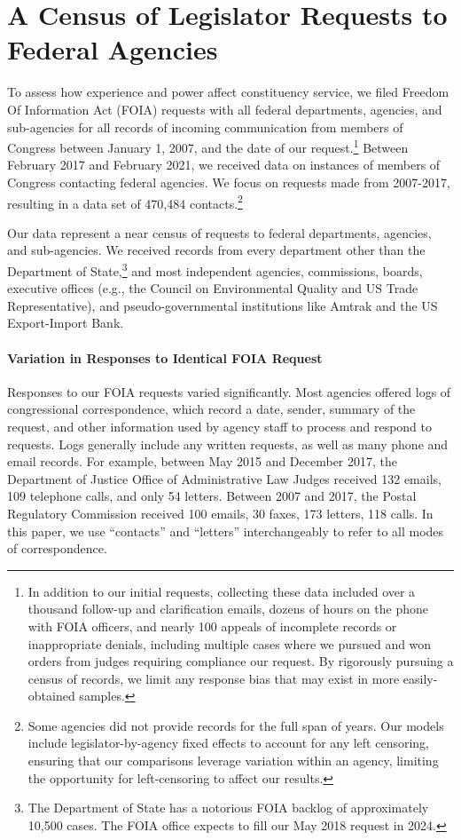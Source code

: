 \documentclass[12pt]{article}
\begin{document}
\section{A Census of Legislator Requests to Federal Agencies} \label{s:data}
To assess how experience and power affect constituency service, we filed   Freedom Of Information Act (FOIA) requests with all federal departments, agencies, and sub-agencies for all records of incoming communication from members of Congress between January 1, 2007, and the date of our request.\footnote{In addition to our initial requests, collecting these data included over a thousand follow-up and clarification emails, dozens of hours on the phone with FOIA officers, and nearly 100 appeals of incomplete records or inappropriate denials, including multiple cases where we pursued and won orders from judges requiring compliance our request. By rigorously pursuing a census of records, we limit any response bias that may exist in more easily-obtained samples.} Between February 2017 and February 2021, we received data on  instances of members of Congress contacting federal agencies. We focus on requests made from 2007-2017, resulting in a data set of 470,484 contacts.\footnote{Some agencies did not provide records for the full span of years. Our models include legislator-by-agency fixed effects to account for any left censoring, ensuring that our comparisons leverage variation within an agency, limiting the opportunity for left-censoring to affect our results.}  %

Our data represent a near census of requests to federal departments, agencies, and sub-agencies. We received records from every department other than the Department of State,\footnote{The Department of State has a notorious FOIA backlog of approximately 10,500 cases. The FOIA office expects to fill our May 2018 request in 2024.} and most independent agencies, commissions, boards, executive offices (e.g., the Council on Environmental Quality and US Trade Representative), and pseudo-governmental institutions like Amtrak and the US Export-Import Bank. 

\paragraph{Variation in Responses to Identical FOIA Request} Responses to our FOIA requests varied significantly. Most agencies offered logs of congressional correspondence, which record a date, sender, summary of the request, and other information used by agency staff to process and respond to requests. Logs generally include any written requests, as well as many phone and email records. For example, between May 2015 and December 2017, the Department of Justice Office of Administrative Law Judges received 132 emails, 109 telephone calls, and only 54 letters. Between 2007 and 2017, the Postal Regulatory Commission received 100 emails, 30 faxes, 173 letters, 118 calls. In this paper, we use ``contacts'' and ``letters'' interchangeably to refer to all modes of correspondence. 
\end{document}

